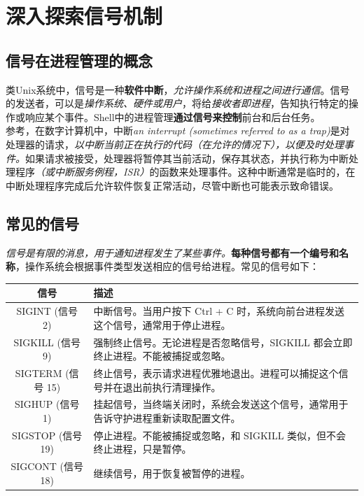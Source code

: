 \section{深入探索信号机制}

\subsection{信号在进程管理的概念}

类Unix系统中，信号是一种\textbf{软件中断}，\textit{允许操作系统和进程之间进行通信}。信号的发送者，可以是\textit{操作系统、硬件或用户}，将给\textit{接收者即进程}，告知执行特定的操作或响应某个事件。Shell中的进程管理\textbf{通过信号来控制}前台和后台任务。\\

参考\cite{enwiki:1243602968}，在数字计算机中，中断\textit{an interrupt (sometimes referred to as a trap)}是对处理器的请求，\textit{以中断当前正在执行的代码（在允许的情况下），以便及时处理事件。}如果请求被接受，处理器将暂停其当前活动，保存其状态，并执行称为中断处理程序\textit{（或中断服务例程，ISR）}的函数来处理事件。这种中断通常是临时的，在中断处理程序完成后允许软件恢复正常活动，尽管中断也可能表示致命错误。

\subsection{常见的信号}

\textit{信号是有限的消息，用于通知进程发生了某些事件。}\textbf{每种信号都有一个编号和名称}，操作系统会根据事件类型发送相应的信号给进程。常见的信号如下：

\begin{longtable}{|c|p{11cm}|}
    \hline
    \textbf{信号} & \textbf{描述} \\
    \hline
    SIGINT (信号 2) & 中断信号。当用户按下 Ctrl + C 时，系统向前台进程发送这个信号，通常用于停止进程。 \\
    \hline
    SIGKILL (信号 9) & 强制终止信号。无论进程是否忽略信号，SIGKILL 都会立即终止进程。不能被捕捉或忽略。 \\
    \hline
    SIGTERM (信号 15) & 终止信号，表示请求进程优雅地退出。进程可以捕捉这个信号并在退出前执行清理操作。 \\
    \hline
    SIGHUP (信号 1) & 挂起信号，当终端关闭时，系统会发送这个信号，通常用于告诉守护进程重新读取配置文件。 \\
    \hline
    SIGSTOP (信号 19) & 停止进程。不能被捕捉或忽略，和 SIGKILL 类似，但不会终止进程，只是暂停。 \\
    \hline
    SIGCONT (信号 18) & 继续信号，用于恢复被暂停的进程。 \\
    \hline
\end{longtable}

